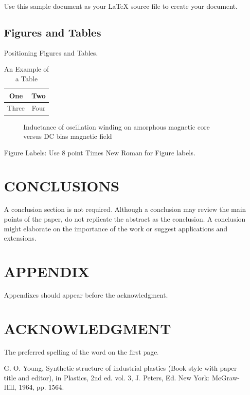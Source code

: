 \documentclass[letterpaper, 10 pt, conference]{ieeeconf}  %
\begin{document}
Use this sample document as your LaTeX source file to create your document. 

\subsection{Figures and Tables}

Positioning Figures and Tables.

\begin{table}[h]
\caption{An Example of a Table}
\label{table_example}
\begin{center}
\begin{tabular}{|c||c|}
\hline
One & Two\\
\hline
Three & Four\\
\hline
\end{tabular}
\end{center}
\end{table}


   \begin{figure}[thpb]
      \centering

      \caption{Inductance of oscillation winding on amorphous
       magnetic core versus DC bias magnetic field}
      \label{figurelabel}
   \end{figure}
   

Figure Labels: Use 8 point Times New Roman for Figure labels. 

\section{CONCLUSIONS}

A conclusion section is not required. Although a conclusion may review the main points of the paper, do not replicate the abstract as the conclusion. A conclusion might elaborate on the importance of the work or suggest applications and extensions. 

\addtolength{\textheight}{-12cm}  

\section*{APPENDIX}

Appendixes should appear before the acknowledgment.

\section*{ACKNOWLEDGMENT}

The preferred spelling of the word on the first page.


\begin{thebibliography}{99}

 G. O. Young, Synthetic structure of industrial plastics (Book style with paper title and editor), in Plastics, 2nd ed. vol. 3, J. Peters, Ed.  New York: McGraw-Hill, 1964, pp. 1564.

\end{thebibliography}
\end{document}
